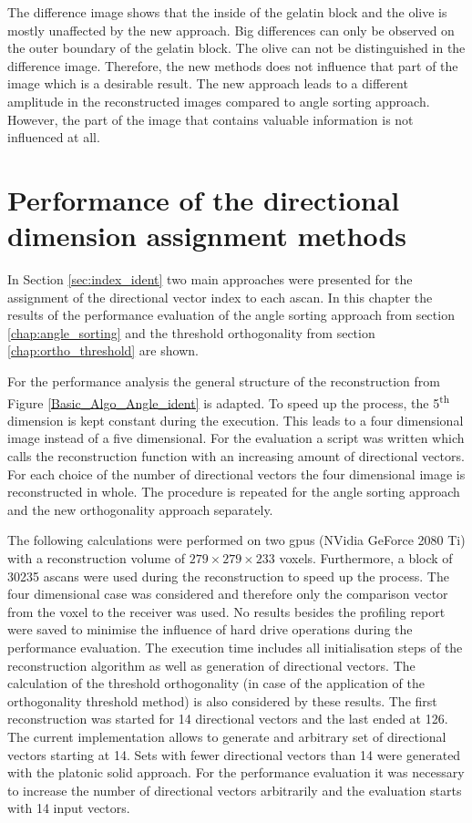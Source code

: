The difference image shows that the inside of the gelatin block and the olive is mostly unaffected by the new approach. Big differences can only be observed on the outer boundary of the gelatin block. The olive can not be distinguished in the difference image. Therefore, the new methods does not influence that part of the image which is a desirable result. The new approach leads to a different amplitude in the reconstructed images compared to angle sorting approach. However, the part of the image that contains valuable information is not influenced at all. 



\section{Performance of the directional dimension assignment methods}
\label{performance_index_ident}

In Section \ref{sec:index_ident} two main approaches were presented for the assignment of the directional vector index to each \ac{ascan}. In this chapter the results of the performance evaluation of the angle sorting approach from section \ref{chap:angle_sorting} and the threshold orthogonality from section \ref{chap:ortho_threshold} are shown. 

For the performance analysis the general structure of the reconstruction from Figure \ref{Basic_Algo_Angle_ident} is adapted. To speed up the process, the 5\textsuperscript{th} dimension is kept constant during the execution. This leads to a four dimensional image instead of a five dimensional. For the evaluation a script was written which calls the reconstruction function with an increasing amount of directional vectors. For each choice of the number of directional vectors the four dimensional image is reconstructed in whole. The procedure is repeated for the angle sorting approach and the new orthogonality approach separately.

The following calculations were performed on two \acp{gpu} (NVidia GeForce 2080 Ti) with a reconstruction volume of $279\times279\times233$ voxels. Furthermore, a block of 30235 \acp{ascan} were used during the reconstruction to speed up the process. The four dimensional case was considered and therefore only the comparison vector from the voxel to the receiver was used. No results besides the profiling report were saved to minimise the influence of hard drive operations during the performance evaluation. The execution time includes all initialisation steps of the reconstruction algorithm as well as generation of directional vectors. The calculation of the threshold orthogonality (in case of the application of the orthogonality threshold method) is also considered by these results. The first reconstruction was started for 14 directional vectors and the last ended at 126. The current implementation allows to generate and arbitrary set of directional vectors starting at 14. Sets with fewer directional vectors than 14 were generated with the platonic solid approach. For the performance evaluation it was necessary to increase the number of directional vectors arbitrarily and the evaluation starts with 14 input vectors.

